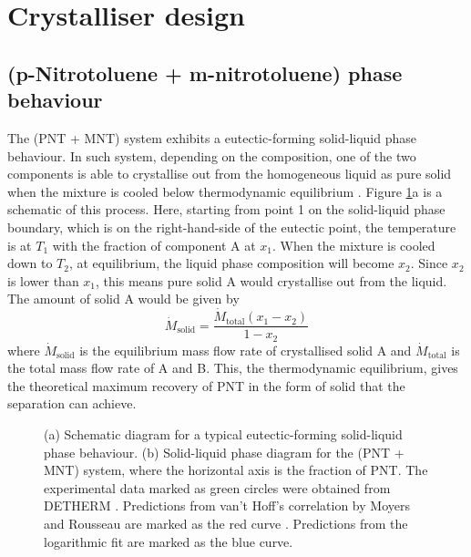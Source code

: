 \section{Crystalliser design}

\subsection{(p-Nitrotoluene + m-nitrotoluene) phase behaviour}

The (PNT + MNT) system exhibits a eutectic-forming solid-liquid phase behaviour. In such system, depending on the composition, one of the two components is able to crystallise out from the homogeneous liquid as pure solid when the mixture is cooled below thermodynamic equilibrium \cite{seader_separation_2011}. Figure \ref{fig:eutectic schematic}a is a schematic of this process. Here, starting from point 1 on the solid-liquid phase boundary, which is on the right-hand-side of the eutectic point, the temperature is at $T_1$ with the fraction of component A at $x_1$. When the mixture is cooled down to $T_2$, at equilibrium, the liquid phase composition will become $x_2$. Since $x_2$ is lower than $x_1$, this means pure solid A would crystallise out from the liquid. The amount of solid A would be given by
\begin{equation}\label{eq:amount solid A equilibrium}
    \dot{M}_{\mathrm{solid}} = \frac{\dot{M}_{\mathrm{total}} (x_1 - x_2)}{1 - x_2}
\end{equation}
where $\dot{M}_{\mathrm{solid}}$ is the equilibrium mass flow rate of crystallised solid A and $\dot{M}_{\mathrm{total}}$ is the total mass flow rate of A and B. This, the thermodynamic equilibrium, gives the theoretical maximum recovery of PNT in the form of solid that the separation can achieve.

\begin{figure}[h]
    \centering
    
    \caption{(a) Schematic diagram for a typical eutectic-forming solid-liquid phase behaviour. (b) Solid-liquid phase diagram for the (PNT + MNT) system, where the horizontal axis is the fraction of PNT. The experimental data marked as green circles were obtained from DETHERM \cite{noauthor_detherm_2021}. Predictions from van't Hoff's correlation by Moyers and Rousseau are marked as the red curve \cite{moyers_crystallization_1987}. Predictions from the logarithmic fit are marked as the blue curve.}
    \label{fig:eutectic schematic}
\end{figure}

